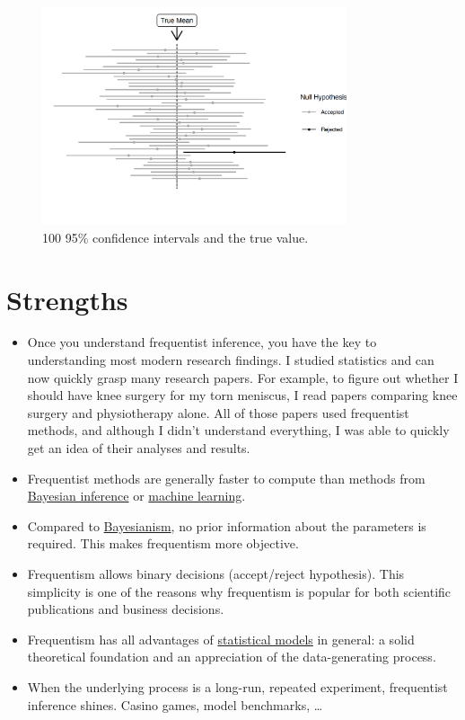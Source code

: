\documentclass[
  10pt,
]{scrbook}
\providecommand{\tightlist}{%
  \setlength{\itemsep}{0pt}\setlength{\parskip}{0pt}}
\begin{document}
\begin{figure}

{\centering \includegraphics[width=0.8\textwidth]{figures/ci-1} 

}

\caption{100 95\% confidence intervals and the true value.}\label{fig:ci}
\end{figure}

\hypertarget{strengths-1}{%
\section{Strengths}\label{strengths-1}}

\begin{itemize}
\tightlist
\item
  Once you understand frequentist inference, you have the key to understanding most modern research findings. I studied statistics and can now quickly grasp many research papers. For example, to figure out whether I should have knee surgery for my torn meniscus, I read papers comparing knee surgery and physiotherapy alone. All of those papers used frequentist methods, and although I didn't understand everything, I was able to quickly get an idea of their analyses and results.
\item
  Frequentist methods are generally faster to compute than methods from \protect\hyperlink{bayesian-inference}{Bayesian inference} or \protect\hyperlink{supervised-ml}{machine learning}.
\item
  Compared to \protect\hyperlink{bayesian-inference}{Bayesianism}, no prior information about the parameters is required. This makes frequentism more objective.
\item
  Frequentism allows binary decisions (accept/reject hypothesis). This simplicity is one of the reasons why frequentism is popular for both scientific publications and business decisions.
\item
  Frequentism has all advantages of \protect\hyperlink{statistical-modeling}{statistical models} in general: a solid theoretical foundation and an appreciation of the data-generating process.
\item
  When the underlying process is a long-run, repeated experiment, frequentist inference shines. Casino games, model benchmarks, \ldots{}
\end{itemize}
\end{document}
